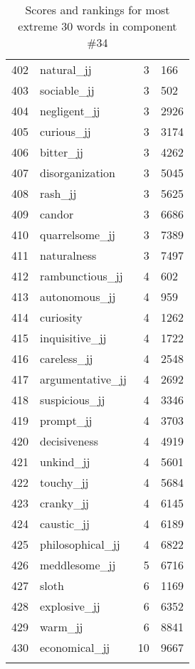 \begin{longtable}[!htbp]{| rlr@{.}l |}
    402 & natural\_jj & 3 & 166 \\
    403 & sociable\_jj & 3 & 502 \\
    404 & negligent\_jj & 3 & 2926 \\
    405 & curious\_jj & 3 & 3174 \\
    406 & bitter\_jj & 3 & 4262 \\
    407 & disorganization & 3 & 5045 \\
    408 & rash\_jj & 3 & 5625 \\
    409 & candor & 3 & 6686 \\
    410 & quarrelsome\_jj & 3 & 7389 \\
    411 & naturalness & 3 & 7497 \\
    412 & rambunctious\_jj & 4 & 602 \\
    413 & autonomous\_jj & 4 & 959 \\
    414 & curiosity & 4 & 1262 \\
    415 & inquisitive\_jj & 4 & 1722 \\
    416 & careless\_jj & 4 & 2548 \\
    417 & argumentative\_jj & 4 & 2692 \\
    418 & suspicious\_jj & 4 & 3346 \\
    419 & prompt\_jj & 4 & 3703 \\
    420 & decisiveness & 4 & 4919 \\
    421 & unkind\_jj & 4 & 5601 \\
    422 & touchy\_jj & 4 & 5684 \\
    423 & cranky\_jj & 4 & 6145 \\
    424 & caustic\_jj & 4 & 6189 \\
    425 & philosophical\_jj & 4 & 6822 \\
    426 & meddlesome\_jj & 5 & 6716 \\
    427 & sloth & 6 & 1169 \\
    428 & explosive\_jj & 6 & 6352 \\
    429 & warm\_jj & 6 & 8841 \\
    430 & economical\_jj & 10 & 9667 \\
    \hline
    \caption{Scores and rankings for most extreme 30 words in component \#34} \\
\end{longtable}
